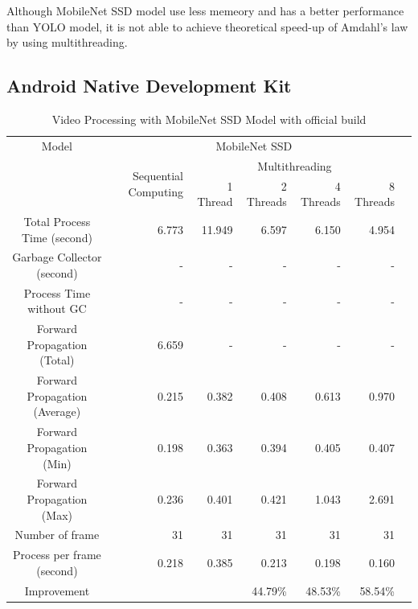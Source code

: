             Although MobileNet SSD model use less memeory and has a better performance than YOLO model,
            it is not able to achieve theoretical speed-up of Amdahl's law by using multithreading.

        \subsection{Android Native Development Kit}

            \begin{table}[!htp]\centering
                \scriptsize
                \begin{tabular}{lrrrrrrr}\toprule
                    \multicolumn{2}{c}{Model} &\multicolumn{5}{c}{MobileNet SSD} \\\cmidrule{1-7}
                    \multicolumn{2}{c}{\multirow{2}{*}{}} &\multirow{2}{*}{Sequential Computing} &\multicolumn{4}{c}{Multithreading} \\\cmidrule{4-7}
                    & & &1 Thread &2 Threads &4 Threads &8 Threads \\\midrule
                    \multicolumn{2}{c}{Total Process Time (second)} &6.773 &11.949 &6.597 &6.150 &4.954 \\
                    \multicolumn{2}{c}{Garbage Collector (second)} &- &- &- &- &- \\
                    \multicolumn{2}{c}{Process Time without GC} &- &- &- &- &- \\
                    \multicolumn{2}{c}{Forward Propagation (Total)} &6.659 &- &- &- &- \\
                    \multicolumn{2}{c}{Forward Propagation (Average)} &0.215 &0.382 &0.408 &0.613 &0.970 \\
                    \multicolumn{2}{c}{Forward Propagation (Min)} &0.198 &0.363 &0.394 &0.405 &0.407 \\
                    \multicolumn{2}{c}{Forward Propagation (Max)} &0.236 &0.401 &0.421 &1.043 &2.691 \\
                    \multicolumn{2}{c}{Number of frame} &31 &31 &31 &31 &31 \\
                    \multicolumn{2}{c}{Process per frame (second)} &0.218 &0.385 &0.213 &0.198 &0.160 \\
                    \multicolumn{2}{c}{Improvement} & & &44.79\% &48.53\% &58.54\% \\
                    \bottomrule
                \end{tabular}

                \caption{Video Processing with MobileNet SSD Model with official build}\label{ssd:official-performace-cpp}
            \end{table}

